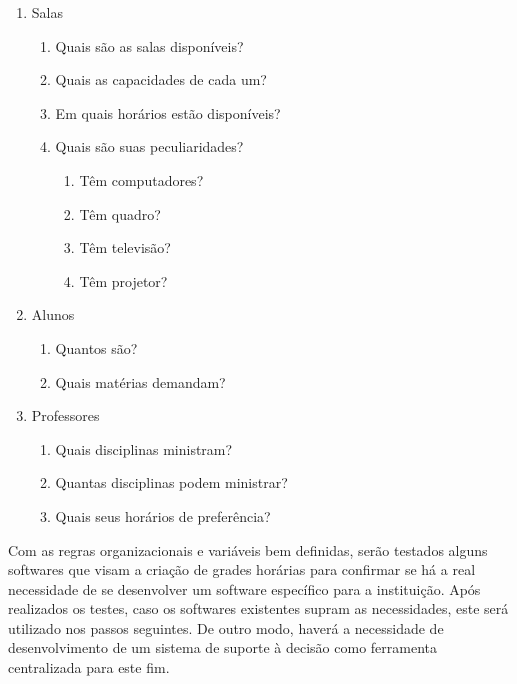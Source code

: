 \begin{enumerate}
  \item Salas
        \begin{enumerate}
          \item Quais são as salas disponíveis?
          \item Quais as capacidades de cada um?
          \item Em quais horários estão disponíveis?
          \item Quais são suas peculiaridades?
                \begin{enumerate}
                  \item Têm computadores?
                  \item Têm quadro?
                  \item Têm televisão?
                  \item Têm projetor?
                \end{enumerate}
        \end{enumerate}
  \item Alunos
        \begin{enumerate}
          \item Quantos são?
          \item Quais matérias demandam?
        \end{enumerate}
  \item Professores
        \begin{enumerate}
          \item Quais disciplinas ministram?
          \item Quantas disciplinas podem ministrar?
          \item Quais seus horários de preferência?
        \end{enumerate}
\end{enumerate}




Com as regras organizacionais e variáveis bem definidas, serão testados alguns softwares que visam a criação de grades horárias para confirmar se há a real necessidade de se desenvolver um software específico para a instituição. Após realizados os testes, caso os softwares existentes supram as necessidades, este será utilizado nos passos seguintes. De outro modo, haverá a necessidade de desenvolvimento de um sistema de suporte à decisão como ferramenta centralizada para este fim.

